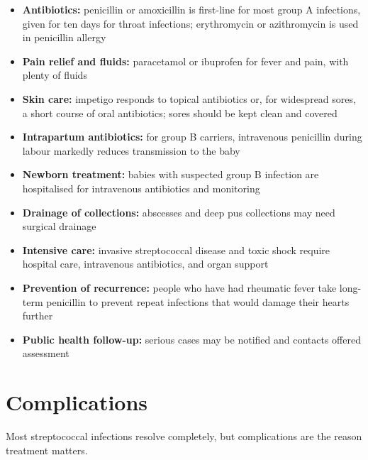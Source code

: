 \begin{itemize}
    \item \textbf{Antibiotics:} penicillin or amoxicillin is first-line for most group A infections, given for ten days for throat infections; erythromycin or azithromycin is used in penicillin allergy
    \item \textbf{Pain relief and fluids:} paracetamol or ibuprofen for fever and pain, with plenty of fluids
    \item \textbf{Skin care:} impetigo responds to topical antibiotics or, for widespread sores, a short course of oral antibiotics; sores should be kept clean and covered
    \item \textbf{Intrapartum antibiotics:} for group B carriers, intravenous penicillin during labour markedly reduces transmission to the baby
    \item \textbf{Newborn treatment:} babies with suspected group B infection are hospitalised for intravenous antibiotics and monitoring
    \item \textbf{Drainage of collections:} abscesses and deep pus collections may need surgical drainage
    \item \textbf{Intensive care:} invasive streptococcal disease and toxic shock require hospital care, intravenous antibiotics, and organ support
    \item \textbf{Prevention of recurrence:} people who have had rheumatic fever take long-term penicillin to prevent repeat infections that would damage their hearts further
    \item \textbf{Public health follow-up:} serious cases may be notified and contacts offered assessment
\end{itemize}

\section*{Complications}
Most streptococcal infections resolve completely, but complications are the reason treatment matters.

